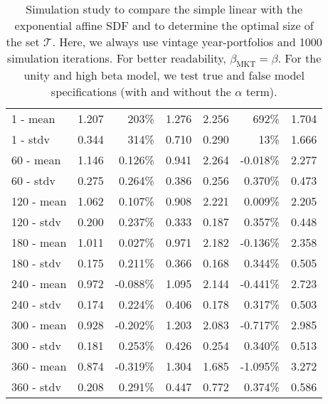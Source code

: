 \begin{table}[ht]
{\begin{tabular}{lrrrrrr}
			\hline
			\hline
			1 - mean & 1.207 & 203\% & 1.276 & 2.256 & 692\% & 1.704 \\ 
			1 - stdv & 0.344 & 314\% & 0.710 & 0.290 & 13\% & 1.666 \\ 
			\hline
			60 - mean & 1.146 & 0.126\% & 0.941 & 2.264 & -0.018\% & 2.277 \\ 
			60 - stdv & 0.275 & 0.264\% & 0.386 & 0.256 & 0.370\% & 0.473 \\ 
			\hline
			120 - mean & 1.062 & 0.107\% & 0.908 & 2.221 & 0.009\% & 2.205 \\ 
			120 - stdv & 0.200 & 0.237\% & 0.333 & 0.187 & 0.357\% & 0.448 \\ 
			\hline
			180 - mean & 1.011 & 0.027\% & 0.971 & 2.182 & -0.136\% & 2.358 \\ 
			180 - stdv & 0.175 & 0.211\% & 0.366 & 0.168 & 0.344\% & 0.505 \\ 
			\hline
			240 - mean & 0.972 & -0.088\% & 1.095 & 2.144 & -0.441\% & 2.723 \\ 
			240 - stdv & 0.174 & 0.224\% & 0.406 & 0.178 & 0.317\% & 0.503 \\ 
			\hline
			300 - mean & 0.928 & -0.202\% & 1.203 & 2.083 & -0.717\% & 2.985 \\ 
			300 - stdv & 0.181 & 0.253\% & 0.426 & 0.254 & 0.340\% & 0.513 \\ 
			\hline
			360 - mean & 0.874 & -0.319\% & 1.304 & 1.685 & -1.095\% & 3.272 \\ 
			360 - stdv & 0.208 & 0.291\% & 0.447 & 0.772 & 0.374\% & 0.586 \\ 
			\hline
			\hline
		\end{tabular}
	}
	\caption{
		Simulation study to compare the simple linear with the exponential affine SDF and to determine the optimal size of the set $\mathcal{T}$.
		Here, we always use vintage year-portfolios and 1000 simulation iterations.
		For better readability, $\beta_{\mathrm{MKT}}=\beta$.
		For the unity and high beta model, we test true and false model specifications (with and without the $\alpha$ term).
	} 
	\label{tab:simulation_study}
\end{table}




